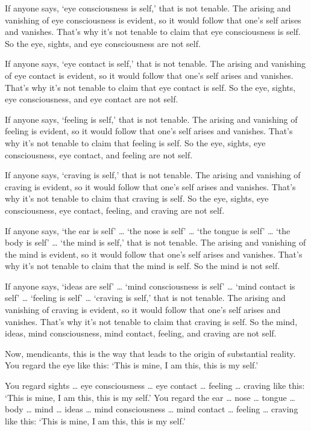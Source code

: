 \documentclass[12pt,openany]{book}%
\begin{document}
If anyone says, ‘eye consciousness is self,’ that is not tenable. The arising and vanishing of eye consciousness is evident, so it would follow that one’s self arises and vanishes. That’s why it’s not tenable to claim that eye consciousness is self. So the eye, sights, and eye consciousness are not self. 

If anyone says, ‘eye contact is self,’ that is not tenable. The arising and vanishing of eye contact is evident, so it would follow that one’s self arises and vanishes. That’s why it’s not tenable to claim that eye contact is self. So the eye, sights, eye consciousness, and eye contact are not self. 

If anyone says, ‘feeling is self,’ that is not tenable. The arising and vanishing of feeling is evident, so it would follow that one’s self arises and vanishes. That’s why it’s not tenable to claim that feeling is self. So the eye, sights, eye consciousness, eye contact, and feeling are not self. 

If anyone says, ‘craving is self,’ that is not tenable. The arising and vanishing of craving is evident, so it would follow that one’s self arises and vanishes. That’s why it’s not tenable to claim that craving is self. So the eye, sights, eye consciousness, eye contact, feeling, and craving are not self. 

If anyone says, ‘the ear is self’ … ‘the nose is self’ … ‘the tongue is self’ … ‘the body is self’ … ‘the mind is self,’ that is not tenable. The arising and vanishing of the mind is evident, so it would follow that one’s self arises and vanishes. That’s why it’s not tenable to claim that the mind is self. So the mind is not self. 

If anyone says, ‘ideas are self’ … ‘mind consciousness is self’ … ‘mind contact is self’ … ‘feeling is self’ … ‘craving is self,’ that is not tenable. The arising and vanishing of craving is evident, so it would follow that one’s self arises and vanishes. That’s why it’s not tenable to claim that craving is self. So the mind, ideas, mind consciousness, mind contact, feeling, and craving are not self. 

Now, mendicants, this is the way that leads to the origin of substantial reality. You regard the eye like this: ‘This is mine, I am this, this is my self.’ 

You regard sights … eye consciousness … eye contact … feeling … craving like this: ‘This is mine, I am this, this is my self.’ You regard the ear … nose … tongue … body … mind … ideas … mind consciousness … mind contact … feeling … craving like this: ‘This is mine, I am this, this is my self.’ 
\end{document}
